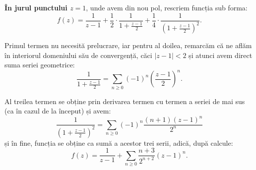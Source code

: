 \textbf{În jurul punctului $ z = 1 $}, unde avem din nou pol, rescriem
funcția sub forma:
\[
  f(z) = \dfrac{1}{z - 1} + \dfrac{1}{2} \cdot \dfrac{1}{1 + \frac{z - 1}{2}} + %
  \dfrac{1}{4} \cdot \dfrac{1}{\left( 1 + \frac{z - 1}{2} \right)^2}.
\]

Primul termen nu necesită prelucrare, iar pentru al doilea, remarcăm că
ne aflăm în interiorul domeniului său de convergență, căci $ |z - 1| < 2 $
și atunci avem direct suma seriei geometrice:
\[
  \dfrac{1}{1 + \frac{z - 1}{2}} = \sum_{n \geq 0} (-1)^n \left( \dfrac{z - 1}{2} \right)^n.
\]

Al treilea termen se obține prin derivarea termen cu termen a seriei
de mai sus (ca în cazul de la început) și avem:
\[
  \dfrac{1}{\left(1 + \frac{z - 1}{2}\right)^2} = %
  \sum_{n \geq 0} (-1)^n \dfrac{(n + 1)(z - 1)^n}{2^n}
\]
și în fine, funcția se obține ca sumă a acestor trei serii, adică, după
calcule:
\[
  f(z) = \dfrac{1}{z - 1} + \sum_{n \geq 0} \dfrac{n + 3}{2^{n+2}} (z - 1)^n.
\]


